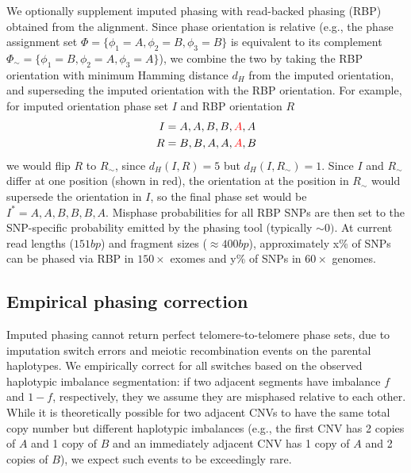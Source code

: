 \documentclass[10pt,letter]{article}
\numberwithin{equation}{section}
\begin{document}
We optionally supplement imputed phasing with read-backed phasing (RBP) obtained from the alignment. Since phase orientation is relative (e.g., the phase assignment set $\Phi=\{\phi_1=A,\phi_2=B,\phi_3=B\}$ is equivalent to its complement $\Phi_\sim=\{\phi_1=B,\phi_2=A,\phi_3=A\}$), we combine the two by taking the RBP orientation with minimum Hamming distance $d_H$ from the imputed orientation, and superseding the imputed orientation with the RBP orientation. For example, for imputed orientation phase set $I$ and RBP orientation $R$
\begin{align*}
I &= {A,A,B,B,\textcolor{red}{A},A}\\
R &= {B,B,A,A,\textcolor{red}{A},B}
\end{align*}
we would flip $R$ to $R_{\sim}$, since $d_H(I,R)=5$ but $d_H(I,R_\sim)=1$. Since $I$ and $R_\sim$ differ at one position (shown in red), the orientation at the position in $R_\sim$ would supersede the orientation in $I$, so the final phase set would be $I^\ast=A,A,B,B,B,A$. Misphase probabilities for all RBP SNPs are then set to the SNP-specific probability emitted by the phasing tool (typically $\sim 0)$. At current read lengths ($151\unit{bp}$) and fragment sizes ($\approx 400\unit{bp}$), approximately x\% of SNPs can be phased via RBP in $150\times$ exomes and y\% of SNPs in $60\times$ genomes.

\subsection{Empirical phasing correction}

Imputed phasing cannot return perfect telomere-to-telomere phase sets, due to imputation switch errors and meiotic recombination events on the parental haplotypes. We empirically correct for all switches based on the observed haplotypic imbalance segmentation: if two adjacent segments have imbalance $f$ and $1-f$, respectively, they we assume they are misphased relative to each other. While it is theoretically possible for two adjacent CNVs to have the same total copy number but different haplotypic imbalances (e.g., the first CNV has 2 copies of $A$ and 1 copy of $B$ and an immediately adjacent CNV has 1 copy of $A$ and 2 copies of $B$), we expect such events to be exceedingly rare.
\end{document}
